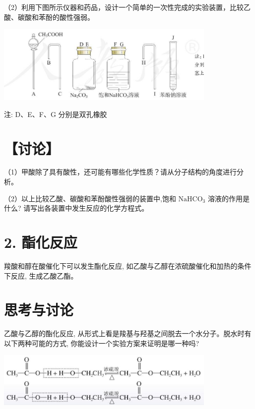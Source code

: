\documentclass[10pt]{article}
\begin{document}
（2）利用下图所示仪器和药品，设计一个简单的一次性完成的实验装置，比较乙酸、碳酸和苯酚的酸性强弱。

\begin{center}
\includegraphics[max width=0.8\textwidth]{images/0190efc5-b58a-7c43-bfb0-e0a030df9cfd_80_407658.jpg}
\end{center}

注: D、E、F、G 分别是双孔橡胶

\section*{【讨论】}

（1）甲酸除了具有酸性，还可能有哪些化学性质？请从分子结构的角度进行分析。

（2）以上比较乙酸、碳酸和苯酚酸性强弱的装置中,饱和 \({\mathrm{{NaHCO}}}_{3}\) 溶液的作用是什么? 请写出各装置中发生反应的化学方程式。

\section*{2. 酯化反应}

羧酸和醇在酸催化下可以发生酯化反应, 如乙酸与乙醇在浓硫酸催化和加热的条件下反应, 生成乙酸乙酯。

\section*{思考与讨论}

乙酸与乙醇的酯化反应, 从形式上看是羧基与羟基之间脱去一个水分子。脱水时有以下两种可能的方式, 你能设计一个实验方案来证明是哪一种吗?

\begin{center}
\includegraphics[max width=0.8\textwidth]{images/0190efc5-b58a-7c43-bfb0-e0a030df9cfd_81_908402.jpg}
\end{center}
\end{document}
